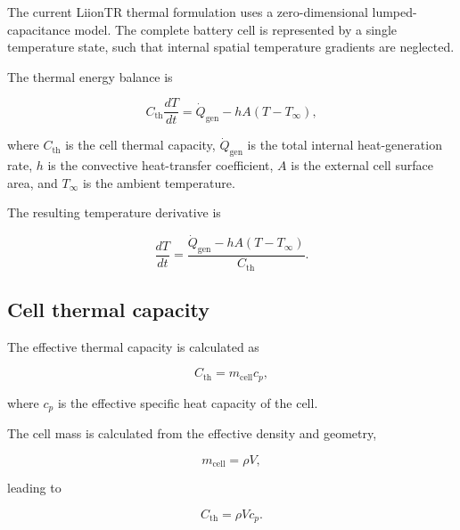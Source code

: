 The current LiionTR thermal formulation uses a zero-dimensional
lumped-capacitance model. The complete battery cell is represented by a
single temperature state, such that internal spatial temperature
gradients are neglected.

The thermal energy balance is

\begin{equation}
    C_{\mathrm{th}}
    \frac{dT}{dt}
    =
    \dot{Q}_{\mathrm{gen}}
    -
    h A
    \left(
        T - T_{\infty}
    \right),
    \label{eq:lumped_thermal_balance}
\end{equation}

where $C_{\mathrm{th}}$ is the cell thermal capacity,
$\dot{Q}_{\mathrm{gen}}$ is the total internal heat-generation rate,
$h$ is the convective heat-transfer coefficient, $A$ is the external
cell surface area, and $T_{\infty}$ is the ambient temperature.

The resulting temperature derivative is

\begin{equation}
    \frac{dT}{dt}
    =
    \frac{
        \dot{Q}_{\mathrm{gen}}
        -
        h A
        \left(
            T-T_{\infty}
        \right)
    }{
        C_{\mathrm{th}}
    }.
    \label{eq:lumped_temperature_derivative}
\end{equation}


\subsection{Cell thermal capacity}

The effective thermal capacity is calculated as

\begin{equation}
    C_{\mathrm{th}}
    =
    m_{\mathrm{cell}}
    c_p,
    \label{eq:thermal_capacity}
\end{equation}

where $c_p$ is the effective specific heat capacity of the cell.

The cell mass is calculated from the effective density and geometry,

\begin{equation}
    m_{\mathrm{cell}}
    =
    \rho V,
    \label{eq:cell_mass}
\end{equation}

leading to

\begin{equation}
    C_{\mathrm{th}}
    =
    \rho V c_p.
\end{equation}

